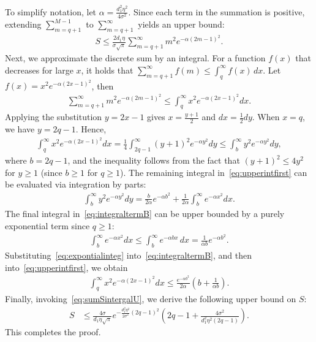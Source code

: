 \documentclass[journal,12pt,onecolumn,draftclsnofoot]{IEEEtran}
\theoremstyle{definition}
\begin{document}
To simplify notation, let $\alpha = \tfrac{d_{1}^{2}\eta^{2}}{4\sigma^{2}}$.  
Since each term in the summation is positive, extending \(\sum_{m = q + 1}^{M - 1}\) to \(\sum_{m = q + 1}^{\infty}\) yields an upper bound:
\begin{align}
    S 
    \leq 
    \frac{2 d_{1}\eta}{\sigma\sqrt{\pi}}
    \sum_{m = q + 1}^{\infty} 
    m^{2} e^{-\alpha (2m - 1)^{2}}.
\end{align}
Next, we approximate the discrete sum by an integral.  
For a function \(f(x)\) that decreases for large \(x\), it holds that  
\(\sum_{m = q + 1}^{\infty} f(m) \leq \int_{q}^{\infty} f(x)\,dx\).  
Let \(f(x) = x^{2} e^{-\alpha (2x - 1)^{2}}\), then
\begin{align*}
    \sum_{m = q + 1}^{\infty} m^{2} e^{-\alpha (2m - 1)^{2}}
    \leq \int_{q}^{\infty} x^{2} e^{-\alpha (2x - 1)^{2}} dx.
\end{align*}
Applying the substitution \(y = 2x - 1\) gives \(x = \tfrac{y + 1}{2}\) and \(dx = \tfrac{1}{2} dy\).  
When \(x = q\), we have \(y = 2q - 1\).  
Hence,
\begin{align}
\int_{q}^{\infty} x^{2} e^{-\alpha (2x - 1)^{2}} dx
= \frac{1}{4}
\int_{2q - 1}^{\infty} (y + 1)^{2} e^{-\alpha y^{2}} dy \leq 
\int_{b}^{\infty} y^{2} e^{-\alpha y^{2}} dy,
\label{eq:upperintfirst}
\end{align}
where \(b = 2q - 1\), and the inequality follows from the fact that \((y + 1)^{2} \le 4y^{2}\) for \(y \ge 1\) (since \(b \ge 1\) for \(q \ge 1\)).   The remaining integral in~\eqref{eq:upperintfirst} can be evaluated via integration by parts:
\begin{align}
\label{eq:integraltermB}
\int_{b}^{\infty} y^{2} e^{-\alpha y^{2}} dy
= \frac{b}{2\alpha} e^{-\alpha b^{2}}
+ \frac{1}{2\alpha} \int_{b}^{\infty} e^{-\alpha x^{2}} dx.
\end{align}
The final integral in~\eqref{eq:integraltermB} can be upper bounded by a purely exponential term since \(q \ge 1\):
\begin{align}
\label{eq:expontialinteg}
\int_{b}^{\infty} e^{-\alpha x^{2}} dx
\leq 
\int_{b}^{\infty} e^{-\alpha b x}\,dx
= \frac{1}{\alpha b} e^{-\alpha b^{2}}.
\end{align}
Substituting~\eqref{eq:expontialinteg} into~\eqref{eq:integraltermB}, and then into~\eqref{eq:upperintfirst}, we obtain
\begin{align}
\int_{q}^{\infty} x^{2} e^{-\alpha (2x - 1)^{2}} dx
\leq 
\frac{e^{-\alpha b^{2}}}{2\alpha}
\left(b + \frac{1}{\alpha b}\right).
\label{eq:sumSintergalU}
\end{align}
Finally, invoking~\eqref{eq:sumSintergalU}, we derive the following upper bound on $S$:
\begin{align*}
S 
&\leq 
\frac{4\sigma}{d_{1}\eta \sqrt{\pi}}
e^{-\tfrac{d_{1}^{2}\eta^{2}}{2\sigma^{2}}(2q - 1)^{2}}
\left( 2q - 1 + \frac{4\sigma^{2}}{d_{1}^{2}\eta^{2}(2q - 1)} \right).
\end{align*}
This completes the proof.



\end{document}
